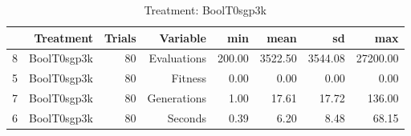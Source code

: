 \begin{table}[ht]
\centering
\begin{tabular}{rrrrrrrr}
  \hline
 & Treatment & Trials & Variable & min & mean & sd & max \\ 
  \hline
8 & BoolT0sgp3k &  80 & Evaluations & 200.00 & 3522.50 & 3544.08 & 27200.00 \\ 
  5 & BoolT0sgp3k &  80 & Fitness & 0.00 & 0.00 & 0.00 & 0.00 \\ 
  7 & BoolT0sgp3k &  80 & Generations & 1.00 & 17.61 & 17.72 & 136.00 \\ 
  6 & BoolT0sgp3k &  80 & Seconds & 0.39 & 6.20 & 8.48 & 68.15 \\ 
   \hline
\end{tabular}
\caption{Treatment: BoolT0sgp3k} 
\end{table}

